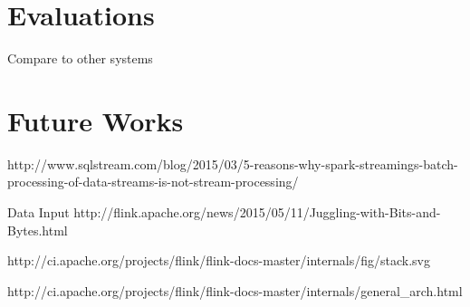 \section{Evaluations}

Compare to other systems


\section{Future Works}


http://www.sqlstream.com/blog/2015/03/5-reasons-why-spark-streamings-batch-processing-of-data-streams-is-not-stream-processing/



Data Input
http://flink.apache.org/news/2015/05/11/Juggling-with-Bits-and-Bytes.html


http://ci.apache.org/projects/flink/flink-docs-master/internals/fig/stack.svg

http://ci.apache.org/projects/flink/flink-docs-master/internals/general\_arch.html